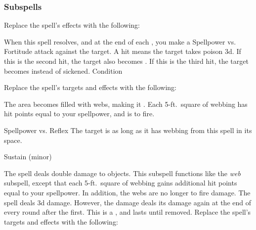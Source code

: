\subsubsection{Subspells}
Replace the spell's effects with the following:
\begin{spellcontent}
\begin{augmenteffects}
\spelleffect
When this spell resolves, and at the end of each , you make a Spellpower vs. Fortitude attack against the target.
A hit means the target takes poison  \minus3d.
If this is the second hit, the target also becomes .
If this is the third hit, the target becomes  instead of sickened.
\spelldur Condition
\end{augmenteffects}
\end{spellcontent}
Replace the spell's targets and effects with the following:
\begin{spellcontent}
\begin{augmenttargetinginfo}
\end{augmenttargetinginfo}
\begin{augmenteffects}
\spelleffect
The area becomes filled with webs, making it .
Each 5-ft.\ square of webbing has hit points equal to your spellpower, and is  to fire.
\begin{spellattack}{Spellpower vs. Reflex}
\spellsuccess The target is \immobilized as long as it has webbing from this spell in its space.
\end{spellattack}
\spelldur Sustain (minor)
\end{augmenteffects}
\end{spellcontent}
The spell deals double damage to objects.
This subspell functions like the \textit{web} subspell, except that each 5-ft.\ square of webbing gains additional hit points equal to your spellpower.
In addition, the webs are no longer  to fire damage.
The spell deals \minus3d damage.
However, the damage deals its damage again at the end of every round after the first.
This is a , and lasts until removed.
Replace the spell's targets and effects with the following:
